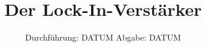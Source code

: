 



\subject{V303}
\title{Der Lock-In-Verstärker}
\date{%
  Durchführung: DATUM
  \hspace{3em}
  Abgabe: DATUM
}


\setlength{\parindent}{0pt} %

\maketitle
\thispagestyle{empty}
\tableofcontents
\newpage


%
%
%



\printbibliography{}


